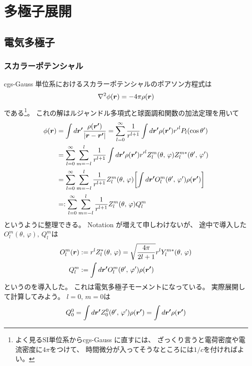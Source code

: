 \documentclass[../../master.tex]{subfiles}
\begin{document}
\chapter{多極子展開}
\section{電気多極子}
\subsection{スカラーポテンシャル}
cgs-Gauss 単位系におけるスカラーポテンシャルのポアソン方程式は
\begin{equation}
    \laplacian \phi(\vb*{r}) = -4\pi\rho(\vb*{r})
\end{equation}
である\footnote{よく見るSI単位系からcgs-Gauss に直すには、
ざっくり言うと電荷密度や電流密度に\(4\pi\)をつけて、
時間微分が入ってそうなところには\(1/c\)を付ければよい。}。
これの解はルジャンドル多項式と球面調和関数の加法定理を用いて
\begin{equation}\begin{aligned}[b]
    \phi(\vb*{r})
    &= \int d\vb*{r'} \frac{\rho(\vb*{r'})}{\abs{\vb*{r}-\vb*{r'}}}
    = \sum_{l=0}^{\infty} \frac{1}{r^{l+1}} \int d\vb*{r'} \rho(\vb*{r'}) {r'}^{l} P_l(\cos\theta')\\
    &= \sum_{l=0}^{\infty} \sum_{m=-l}^{l} \frac{1}{r^{l+1}}\int d\vb*{r'} \rho(\vb*{r'}){r'}^l Z_l^m(\theta,\,\varphi) Z_l^{m*} (\theta',\,\varphi')\\
    &= \sum_{l=0}^{\infty} \sum_{m=-l}^{l} \frac{1}{r^{l+1}}Z_l^m(\theta,\,\varphi) \qty[\int d\vb*{r'} O_l^{m} (\theta',\,\varphi')\rho(\vb*{r'})]\\
    &=:\sum_{l=0}^{\infty} \sum_{m=-l}^{l} \frac{1}{r^{l+1}}Z_l^m(\theta,\,\varphi) Q_l^m
\end{aligned}\end{equation}
というように整理できる。
Notation が増えて申しわけないが、
途中で導入した\(O_l^m(\theta,\,\varphi),\,Q_l^m\)は
\begin{align}
    O_l^m(\vb*{r}) &:= r^l Z_l^{*}(\theta,\,\varphi) = \sqrt{\frac{4\pi}{2l+1}}r^lY_l^{m*}(\theta,\,\varphi)\\
    Q_l^m &:= \int d\vb*{r'} O_l^{m} (\theta',\,\varphi') \rho(\vb*{r'})
\end{align}
というのを導入した。
これは電気多極子モーメントになっている。
実際展開して計算してみよう。
\(l=0,\,m=0\)は
\begin{align}
    Q_0^0
    = \int d\vb*{r'}  Z_0^0 (\theta',\,\varphi') \rho(\vb*{r'})
    = \int d\vb*{r'} \rho(\vb*{r'})
\end{align}
\end{document}
